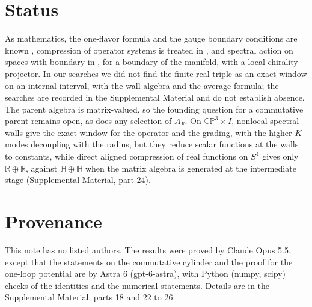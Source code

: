 \documentclass[aps,prd,reprint,onecolumn,nofootinbib,amsmath,amssymb,floatfix]{revtex4-2}
\theoremstyle{plain}
\renewcommand{\H}{\mathbb H}
\newcommand{\supp}[1]{Supplemental Material, part #1}
\begin{document}
\section{Status}

As mathematics, the one-flavor formula and the gauge boundary conditions are known \cite{Csaki2004,Csaki2003}, compression of operator systems is treated in \cite{CvS2021}, and spectral action on spaces with boundary in \cite{CC2011}, for a boundary of the manifold, with a local chirality projector. In our searches we did not find the finite real triple as an exact window on an internal interval, with the wall algebra and the average formula; the searches are recorded in the Supplemental Material and do not establish absence. The parent algebra is matrix-valued, so the founding question for a commutative parent remains open, as does any selection of $A_F$. On $\mathbb{CP}^3\times I$, nonlocal spectral walls give the exact window for the operator and the grading, with the higher $K$-modes decoupling with the radius, but they reduce scalar functions at the walls to constants, while direct aligned compression of real functions on $S^4$ gives only $\mathbb R\oplus\mathbb R$, against $\H\oplus\H$ when the matrix algebra is generated at the intermediate stage (\supp{24}).

\section*{Provenance}

This note has no listed authors. The results were proved by Claude Opus 5.5, except that the statements on the commutative cylinder and the proof for the one-loop potential are by Astra 6 (gpt-6-astra), with Python (numpy, scipy) checks of the identities and the numerical statements. Details are in the Supplemental Material, parts 18 and 22 to 26.


\end{document}
